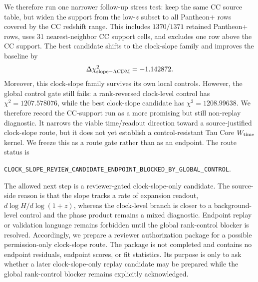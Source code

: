 \documentclass[11pt]{article}
\begin{document}
We therefore run one narrower follow-up stress test: keep the same CC source
table, but widen the support from the low-\(z\) subset to all Pantheon+ rows
covered by the CC redshift range.  This includes \(1370/1371\) retained
Pantheon+ rows, uses 31 nearest-neighbor CC support cells, and excludes one row
above the CC support.  The best candidate shifts to the clock-slope family and
improves the baseline by
\[
  \Delta\chi^2_{\rm slope-\Lambda CDM}=-1.142872.
\]
Moreover, this clock-slope family survives its own local controls.  However,
the global control gate still fails: a rank-reversed clock-level control has
\(\chi^2=1207.578076\), while the best clock-slope candidate has
\(\chi^2=1208.99638\).  We therefore record the CC-support run as a more
promising but still non-replay diagnostic.  It narrows the viable
time/readout direction toward a source-justified clock-slope route, but it does
not yet establish a control-resistant Tau Core \(W_{\rm time}\) kernel.
We freeze this as a route gate rather than as an endpoint.  The route status is
\begin{center}\texttt{CLOCK\_\allowbreak{}SLOPE\_\allowbreak{}REVIEW\_\allowbreak{}CANDIDATE\_\allowbreak{}ENDPOINT\_\allowbreak{}BLOCKED\_\allowbreak{}BY\_\allowbreak{}GLOBAL\_\allowbreak{}CONTROL}.\end{center}
The allowed next step is a reviewer-gated clock-slope-only candidate.  The
source-side reason is that the slope tracks a rate of expansion readout,
\(d\log H/d\log(1+z)\), whereas the clock-level branch is closer to a
background-level control and the phase product remains a mixed diagnostic.
Endpoint replay or validation language remains forbidden until the global
rank-control blocker is resolved.
Accordingly, we prepare a reviewer authorization package for a possible
permission-only clock-slope route.  The package is not completed and contains
no endpoint residuals, endpoint scores, or fit statistics.  Its purpose is only
to ask whether a later clock-slope-only replay candidate may be prepared while
the global rank-control blocker remains explicitly acknowledged.
\end{document}
